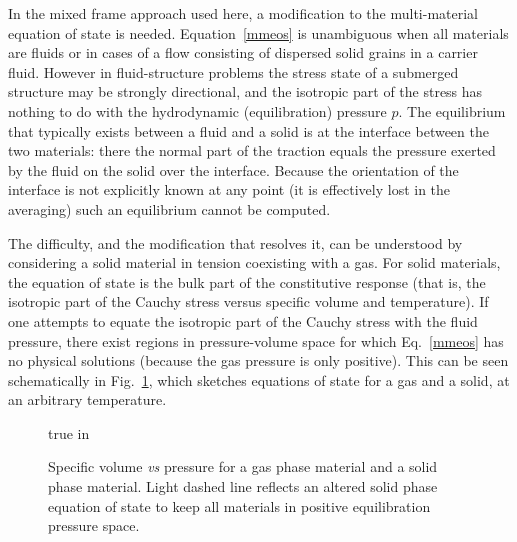 In the mixed frame approach used here, a modification to the multi-material equation
of state is needed.  Equation~\ref{mmeos} is unambiguous when all materials
are fluids or in cases of a flow consisting of dispersed solid
grains in a carrier fluid.  However in fluid-structure problems the stress
state of a submerged structure may be strongly directional, and the
isotropic part of the stress has nothing to do with the hydrodynamic
(equilibration) pressure $p$.  The equilibrium that typically exists between 
a fluid and a solid is at the interface between the two materials: there the 
normal part of the traction equals the pressure exerted by the fluid on the 
solid over the interface.  Because the orientation of the interface is not 
explicitly known at any point (it is effectively lost in the averaging) such 
an equilibrium cannot be computed.

The difficulty, and the modification that resolves it, can be understood by
considering a solid material in tension coexisting with a gas. 
For solid materials, the equation of state is the bulk part of the
constitutive response (that is, the isotropic part of the Cauchy stress versus
specific volume and temperature).  If one attempts to equate the isotropic
part of the Cauchy stress with the fluid pressure, there exist regions in
pressure-volume space for which Eq.~\ref{mmeos} has no physical solutions
(because the gas pressure is only positive).  This can be seen schematically
in Fig.~\ref{vpfig}, which sketches equations of state for a gas and a 
solid, at an arbitrary temperature.
\begin{figure}[t]
  true in
 \caption{Specific volume {\it vs} pressure for a gas phase material 
          and a solid phase material.  Light dashed line reflects an 
          altered solid phase equation of state to keep all materials
          in positive equilibration pressure space.}
 \label{vpfig}
\end{figure}

